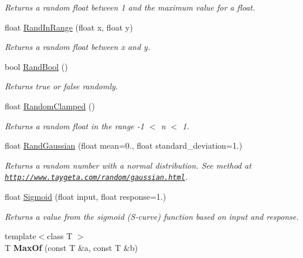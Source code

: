 \begin{DoxyCompactItemize}
\begin{DoxyCompactList}\small\item\em Returns a random float between 1 and the maximum value for a float. \end{DoxyCompactList}\item 
float \hyperlink{namespacesteer_ace1e45e598d82a4fa251ff00f68df616}{Rand\-In\-Range} (float x, float y)
\begin{DoxyCompactList}\small\item\em Returns a random float between x and y. \end{DoxyCompactList}\item 
\hypertarget{namespacesteer_aa1b5e00f4b545ddc843bd5669bb6df92}{bool \hyperlink{namespacesteer_aa1b5e00f4b545ddc843bd5669bb6df92}{Rand\-Bool} ()}\label{namespacesteer_aa1b5e00f4b545ddc843bd5669bb6df92}

\begin{DoxyCompactList}\small\item\em Returns true or false randomly. \end{DoxyCompactList}\item 
\hypertarget{namespacesteer_a7784de28ffa4a247369c2692e17ce423}{float \hyperlink{namespacesteer_a7784de28ffa4a247369c2692e17ce423}{Random\-Clamped} ()}\label{namespacesteer_a7784de28ffa4a247369c2692e17ce423}

\begin{DoxyCompactList}\small\item\em Returns a random float in the range -\/1 $<$ n $<$ 1. \end{DoxyCompactList}\item 
float \hyperlink{namespacesteer_aaa827e0c23a91ed39816b5a57f255670}{Rand\-Gaussian} (float mean=0., float standard\-\_\-deviation=1.)
\begin{DoxyCompactList}\small\item\em Returns a random number with a normal distribution. See method at \href{http://www.taygeta.com/random/gaussian.html}{\tt http\-://www.\-taygeta.\-com/random/gaussian.\-html}. \end{DoxyCompactList}\item 
float \hyperlink{namespacesteer_a53d45ec24b828cfc1feeb41da8c8b5d7}{Sigmoid} (float input, float response=1.)
\begin{DoxyCompactList}\small\item\em Returns a value from the sigmoid (S-\/curve) function based on input and response. \end{DoxyCompactList}\item 
\hypertarget{namespacesteer_a58689664dbe73f69b7652a3183e69c53}{{\footnotesize template$<$class T $>$ }\\T {\bfseries Max\-Of} (const T \&a, const T \&b)}\label{namespacesteer_a58689664dbe73f69b7652a3183e69c53}


\end{DoxyCompactItemize}
